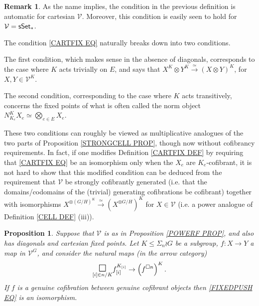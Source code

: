 \documentclass[a4paper,10pt
,draft
]{article}%
\numberwithin{equation}{section}
\numberwithin{figure}{section}
\newtheorem{proposition}[equation]{Proposition}%
\theoremstyle{definition} %
\newtheorem{remark}[equation]{Remark}%
\newcommand{\1}{\ensuremath{\mathbbm 1}}%
\begin{document}
\begin{remark}
As the name implies, the condition in the previous definition is automatic for cartesian 
$\mathcal{V}$. Moreover, this condition is easily seen to hold for $\mathcal{V} = \mathsf{sSet}_{\**}$.

The condition \eqref{CARTFIX EQ} naturally breaks down into two conditions.

The first condition, which makes sense in the absence of diagonals, corresponds to the case where $K$ acts trivially on $E$,
and says that $X^K \otimes Y^K \xrightarrow{\simeq} (X \otimes Y)^K$, for $X,Y \in \mathcal{V}^K$.

The second condition, corresponding to the case where $K$ acts transitively, 
concerns the fixed points of what is often called the norm object
$N_{K_e}^K X_e \simeq \bigotimes_{e \in E} X_e$.

These two conditions can roughly
be viewed as multiplicative analogues 
of the two parts of Proposition \ref{STRONGCELL PROP},
though now without cofibrancy requirements.
In fact, if one modifies
Definition \ref{CARTFIX DEF} 
by requiring that
\eqref{CARTFIX EQ}
be an isomorphism only when the
$X_e$ are $K_e$-cofibrant,
it is not hard to show that
this modified condition can be deduced from
the requirement that $\mathcal{V}$ be strongly
cofibrantly generated (i.e. that the domains/codomains of the (trivial) generating cofibrations be cofibrant)
together with
isomorphisms
$X^{\otimes (G/H)^K} \xrightarrow{\simeq} 
\left( X^{\otimes G/H} \right)^K$
for $X \in \mathcal{V}$
(i.e. a power analogue of 
Definition \ref{CELL DEF} (iii)).
\end{remark}


\begin{proposition}\label{FIXEDPUSH PROP}
	Suppose that $\mathcal{V}$ is as in Proposition \ref{POWERF PROP},
	and also has diagonals and cartesian fixed points.
	Let $K \leq \Sigma_n \wr G$ be a subgroup, 
	$f \colon X \to Y$ a map in $\mathcal{V}^G$,
	and consider the natural maps (in the arrow category)
\begin{equation}\label{FIXEDPUSH EQ}
	\underset{[i] \in n/K}{\mathlarger{\mathlarger{\square}}}
	f_{[i]}^{K_{[i]}}
\to
	\left( f^{\square n} \right)^K.
\end{equation}
If $f$ is a genuine cofibration between genuine cofibrant objects then 
\eqref{FIXEDPUSH EQ} is an isomorphism.
\end{proposition}
\end{document}
